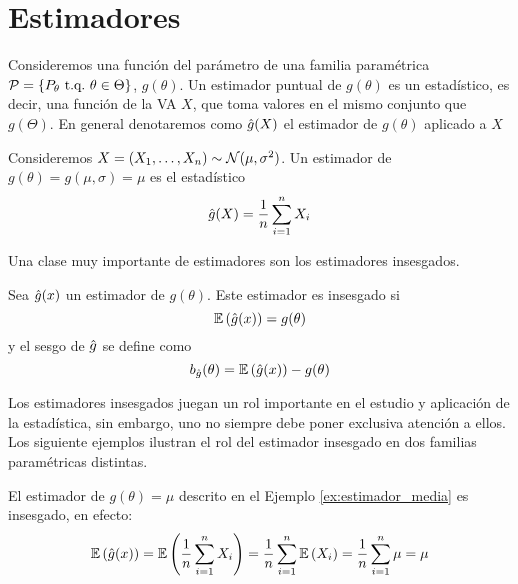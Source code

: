 

\chapter{Estimadores}

Consideremos una función del parámetro de una familia paramétrica $\mathcal{P} = \{P_\theta\ {\text{t.q.}}\ \theta\in\Theta\}$, $g(\theta)$.  Un estimador puntual de $g(\theta)$ es un estadístico, es decir, una función de la VA $X$, que toma valores en el mismo conjunto que $g(\Theta)$. En general denotaremos como ${ \hat{g}}(X)$ el estimador de $g(\theta)$ aplicado a $X$ 


\begin{example}
	\label{ex:estimador_media}
	Consideremos $X = (X_1,\ldots,X_n)\sim{\mathcal N}(\mu,\sigma^2)$. Un estimador de $g(\theta) = g(\mu,\sigma) = \mu$ es el estadístico 
	\begin{equation}
		{ \hat{g}}(X) = \frac{1}{n}\sum_{i=1}^nX_i
	\end{equation} 
\end{example}

Una clase muy importante de estimadores son los estimadores insesgados. 

\begin{definition}
	Sea ${ \hat{g}(x)}$ un estimador de $g(\theta)$. Este estimador es insesgado si 
	\begin{equation}
		\mathbb{E} \left({ \hat{g}(x)}\right) = g(\theta)
	\end{equation}
	y el sesgo de ${ \hat{g}}$ se define como 
	\begin{equation}
		b_{ \hat{g}}(\theta) = \mathbb{E} \left({ \hat{g}(x)}\right) - g(\theta)
	\end{equation}
\end{definition}



Los estimadores insesgados juegan un rol importante en el estudio y aplicación de la estadística, sin embargo, uno no siempre debe poner exclusiva atención a ellos. Los siguiente ejemplos ilustran el rol del estimador insesgado en dos familias paramétricas distintas. 

\begin{example}
	\label{ex:estimador_in_media}
	El estimador de $g(\theta) =  \mu$ descrito en el Ejemplo \ref{ex:estimador_media} es insesgado, en efecto: 
	\begin{equation}
		\mathbb{E} \left({ \hat{g}(x)}\right) = \mathbb{E} \left(\frac{1}{n}\sum_{i=1}^nX_i\right)	= \frac{1}{n}\sum_{i=1}^n\mathbb{E} \left(X_i\right)		= \frac{1}{n}\sum_{i=1}^n\mu = \mu	
	\end{equation}
\end{example}


